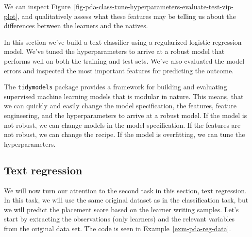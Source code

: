 \documentclass[
  letterpaper,
  DIV=11,
  numbers=noendperiod]{scrreprt}
\theoremstyle{definition}
\theoremstyle{remark}
\begin{document}
We can inspect
Figure~\ref{fig-pda-class-tune-hyperparameters-evaluate-test-vip-plot},
and qualitatively assess what these features may be telling us about the
differences between the learners and the natives.

In this section we've build a text classifier using a regularized
logistic regression model. We've tuned the hyperparameters to arrive at
a robust model that performs well on both the training and test sets.
We've also evaluated the model errors and inspected the most important
features for predicting the outcome.

The \texttt{tidymodels} package provides a framework for building and
evaluating supervised machine learning models that is modular in nature.
This means, that we can quickly and easily change the model
specification, the features, feature engineering, and the
hyperparameters to arrive at a robust model. If the model is not robust,
we can change models in the model specification. If the features are not
robust, we can change the recipe. If the model is overfitting, we can
tune the hyperparameters.

\subsection{Text regression}\label{sec-pda-text-regression}

We will now turn our attention to the second task in this section, text
regression. In this task, we will use the same original dataset as in
the classification task, but we will predict the placement score based
on the learner writing samples. Let's start by extracting the
observations (only learners) and the relevant variables from the
original data set. The code is seen in Example~\ref{exm-pda-reg-data}.
\end{document}
